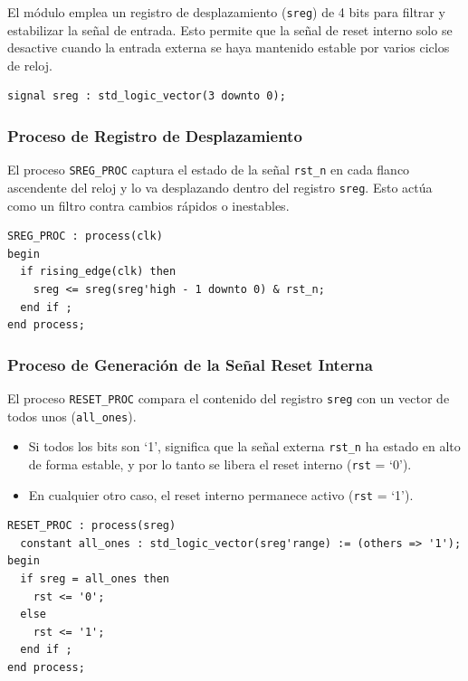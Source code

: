 \documentclass[a4paper,12pt]{article}
\begin{document}
El módulo emplea un registro de desplazamiento (\texttt{sreg}) de 4 bits para filtrar y estabilizar la señal de entrada. Esto permite que la señal de reset interno solo se desactive cuando la entrada externa se haya mantenido estable por varios ciclos de reloj.

\begin{lstlisting}[caption={Registro de desplazamiento para filtrado}, label={lst:reset_signal}]
signal sreg : std_logic_vector(3 downto 0);
\end{lstlisting}

\subsubsection{Proceso de Registro de Desplazamiento}

El proceso \texttt{SREG\_PROC} captura el estado de la señal \texttt{rst\_n} en cada flanco ascendente del reloj y lo va desplazando dentro del registro \texttt{sreg}. Esto actúa como un filtro contra cambios rápidos o inestables.

\begin{lstlisting}[caption={Proceso de desplazamiento de la señal rst\_n}, label={lst:sreg_proc}]
SREG_PROC : process(clk)
begin
  if rising_edge(clk) then
    sreg <= sreg(sreg'high - 1 downto 0) & rst_n;
  end if ;
end process;
\end{lstlisting}

\subsubsection{Proceso de Generación de la Señal Reset Interna}

El proceso \texttt{RESET\_PROC} compara el contenido del registro \texttt{sreg} con un vector de todos unos (\texttt{all\_ones}).  
\begin{itemize}
    \item Si todos los bits son ‘1’, significa que la señal externa \texttt{rst\_n} ha estado en alto de forma estable, y por lo tanto se libera el reset interno (\texttt{rst} = ‘0’).
    \item En cualquier otro caso, el reset interno permanece activo (\texttt{rst} = ‘1’).
\end{itemize}

\begin{lstlisting}[caption={Proceso de generación del reset interno}, label={lst:reset_proc}]
RESET_PROC : process(sreg)
  constant all_ones : std_logic_vector(sreg'range) := (others => '1');
begin
  if sreg = all_ones then
    rst <= '0';
  else
    rst <= '1';
  end if ;
end process;
\end{lstlisting}
\end{document}
